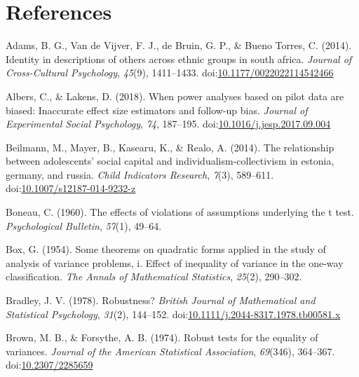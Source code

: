 \documentclass[man,floatsintext]{apa6}
\begin{document}
\newpage

\hypertarget{references}{%
\section{References}\label{references}}

\setlength{\parindent}{-0.5in}
\setlength{\leftskip}{0.5in}

\hypertarget{refs}{}
\leavevmode\hypertarget{ref-Adams_et_al_2014}{}%
Adams, B. G., Van de Vijver, F. J., de Bruin, G. P., \& Bueno Torres, C. (2014). Identity in descriptions of others across ethnic groups in south africa. \emph{Journal of Cross-Cultural Psychology}, \emph{45}(9), 1411--1433. doi:\href{https://doi.org/10.1177/0022022114542466}{10.1177/0022022114542466}

\leavevmode\hypertarget{ref-Albers_and_Lakens_2018}{}%
Albers, C., \& Lakens, D. (2018). When power analyses based on pilot data are biased: Inaccurate effect size estimators and follow-up bias. \emph{Journal of Experimental Social Psychology}, \emph{74}, 187--195. doi:\href{https://doi.org/10.1016/j.jesp.2017.09.004}{10.1016/j.jesp.2017.09.004}

\leavevmode\hypertarget{ref-Beilmann_et_al_2014}{}%
Beilmann, M., Mayer, B., Kasearu, K., \& Realo, A. (2014). The relationship between adolescents' social capital and individualism-collectivism in estonia, germany, and russia. \emph{Child Indicators Research}, \emph{7}(3), 589--611. doi:\href{https://doi.org/10.1007/s12187-014-9232-z}{10.1007/s12187-014-9232-z}

\leavevmode\hypertarget{ref-Boneau_1960}{}%
Boneau, C. (1960). The effects of violations of assumptions underlying the t test. \emph{Psychological Bulletin}, \emph{57}(1), 49--64.

\leavevmode\hypertarget{ref-Box_1954}{}%
Box, G. (1954). Some theorems on quadratic forms applied in the study of analysis of variance problems, i. Effect of inequality of variance in the one-way classification. \emph{The Annals of Mathematical Statistics}, \emph{25}(2), 290--302.

\leavevmode\hypertarget{ref-Bradley_1978}{}%
Bradley, J. V. (1978). Robustness? \emph{British Journal of Mathematical and Statistical Psychology}, \emph{31}(2), 144--152. doi:\href{https://doi.org/10.1111/j.2044-8317.1978.tb00581.x}{10.1111/j.2044-8317.1978.tb00581.x}

\leavevmode\hypertarget{ref-Brown_and_Forsythe_1974}{}%
Brown, M. B., \& Forsythe, A. B. (1974). Robust tests for the equality of variances. \emph{Journal of the American Statistical Association}, \emph{69}(346), 364--367. doi:\href{https://doi.org/10.2307/2285659}{10.2307/2285659}
\end{document}
